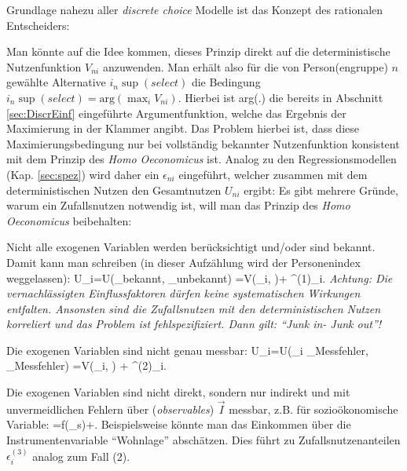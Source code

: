 Grundlage nahezu aller \textit{discrete choice} Modelle ist das
Konzept des rationalen Entscheiders:

Man k\"onnte auf die Idee kommen, dieses Prinzip direkt auf die
deterministische Nutzenfunktion $V_{ni}$ anzuwenden. Man erh\"alt also
f\"ur die von Person(engruppe) $n$ gew\"ahlte Alternative
$i_n\sup{(select)}$ die Bedingung
$
i_n\sup{(select)} = \text{arg} \left(\max_i V_{ni} \right).
$
%
Hierbei ist arg(.) die bereits in Abschnitt \ref{sec:DiscrEinf}
eingef\"uhrte  Argumentfunktion, welche das Ergebnis der Maximierung
in der Klammer angibt. Das Problem hierbei ist, dass
diese Maximierungsbedingung nur bei vollst\"andig bekannter Nutzenfunktion 
konsistent mit dem Prinzip des \textit{Homo
Oeconomicus} ist. Analog
zu den Regressionsmodellen (Kap. \ref{sec:spez}) wird daher ein 
$\epsilon_{ni}$ eingef\"uhrt, welcher
zusammen mit dem deterministischen Nutzen  den Gesamtnutzen $U_{ni}$ ergibt:
Es gibt mehrere Gr\"unde, warum ein Zufallsnutzen notwendig ist, will
man das Prinzip des \emph{Homo Oeconomicus} beibehalten:

\bi
\item[(1)] Nicht alle exogenen Variablen werden ber\"ucksichtigt und/oder
sind bekannt. Damit kann man schreiben (in dieser Aufz\"ahlung wird der
Personenindex weggelassen):
\bdm
U_i=U(_\textrm{bekannt}, 
          _\textrm{unbekannt})
  =V(_i, )+ \epsilon^{(1)}_i.
\edm
\emph{Achtung: Die vernachl\"assigten
Einflussfaktoren d\"urfen keine systematischen Wirkungen
entfalten. Ansonsten sind die Zufallsnutzen 
mit den deterministischen Nutzen korreliert und das Problem ist
fehlspezifiziert. Dann gilt: ``Junk in- Junk out''!}

\item[(2)] Die exogenen Variablen sind nicht genau messbar:
\bdm
U_i=U(_i _\textrm{Messfehler}, 
   \underbrace{+\vec{\epsilon}}_\textrm{Messfehler})
  =V(_i, ) + \epsilon^{(2)}_i.
\edm

\item[(3)] Die exogenen Variablen sind nicht direkt, sondern nur
indirekt und mit unvermeidlichen Fehlern 
\"uber  (\textit{observables})  $\vec{I}$ messbar, z.B. f\"ur
sozio\"okonomische Variable:
\bdm
{}=f(_s)+\vec{\epsilon}.
\edm
Beispielsweise k\"onnte man das Einkommen \"uber die
Instrumentenvariable ``Wohnlage'' absch\"atzen. Dies f\"uhrt zu
Zufallsnutzenanteilen $\epsilon^{(3)}_i$ analog zum Fall  (2).

